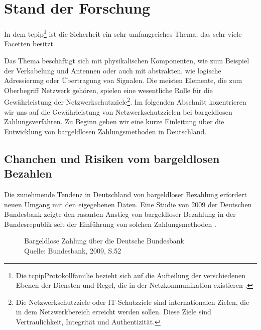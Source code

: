 \section{Stand der Forschung}

In dem \acrfull{tcpip}\footnote{Die \acrshort{tcpip}Protokollfamilie bezieht sich auf die Aufteilung 
der verschiedenen Ebenen der Diensten und Regel, die in der Netzkommunikation existieren \cite{refbook:SWIS}.} ist 
die Sicherheit ein sehr umfangreiches Thema, das sehr viele Facetten besitzt. 


Das Thema beschäftigt sich mit physikalischen 
Komponenten, wie zum Beispiel der Verkabelung und Antennen oder auch mit abstrakten, wie logische Adressierung oder 
Übertragung von Signalen. Die meisten Elemente, die zum Oberbegriff Netzwerk gehören, spielen eine wesentliche Rolle 
für die Gewährleistung der Netzwerkschutzziele\footnote{Die Netzwerkschutzziele oder IT-Schutzziele sind internationalen
Zielen, die in dem Netzwerkbereich erreicht werden sollen. Diese Ziele sind Vertraulichkeit, Integrität und 
Authentizität.}. Im folgenden Abschnitt kozentrieren wir uns auf die Gewährleistung von Netzwerkschutzzielen
bei bargeldlosen Zahlungsverfahren. Zu Beginn geben wir eine kurze Einleitung über die Entwicklung von bargeldlosen
Zahlungsmethoden in Deutschland.


\subsection{Chanchen und Risiken vom bargeldlosen Bezahlen}

Die zunehmende Tendenz in Deutschland von bargeldloser Bezahlung erfordert neuen Umgang mit den eigegebenen Daten. 
Eine Studie von 2009 der Deutschen Bundesbank zeigte den rasanten Anstieg von bargeldloser Bezahlung in der
Bundesrepublik seit der Einführung von solchen Zahlungsmethoden \cite{refrep:DBCP}.

\begin{figure}[H]
    \caption{Bargeldlose Zahlung über die Deutsche Bundesbank\\ Quelle: Bundesbank, 2009, S.52}
    \label{fig:refrep_DB}
\end{figure}


